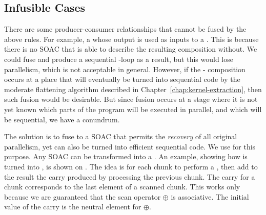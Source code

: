 \subsection{Infusible Cases}
\label{sec:streamseq-fusion}

There are some producer-consumer relationships that cannot be fused by
the above rules.  For example, a  whose output is used
as inputs to a .  This is because there is no SOAC that is
able to describe the resulting composition without.  We could fuse and
produce a sequential -loop as a result, but this would lose
parallelism, which is not acceptable in general.  However, if the
- composition occurs at a place that will eventually
be turned into sequential code by the moderate flattening algorithm
described in Chapter~\ref{chap:kernel-extraction}, then such fusion
would be desirable.  But since fusion occurs at a stage where it is
not yet known which parts of the program will be executed in parallel,
and which will be sequential, we have a conundrum.

The solution is to fuse to a SOAC that permits the \textit{recovery}
of all original parallelism, yet can also be turned into efficient
sequential code.  We use  for this purpose.  Any SOAC
can be transformed into a .  An example, showing how
 is turned into , is shown on
.  The idea is for each chunk to
perform a , then add to the result the carry produced by
processing the previous chunk.  The carry for a chunk corresponds to
the last element of a scanned chunk.  This works only because we are
guaranteed that the scan operator $\oplus$ is associative.  The
initial value of the carry is the neutral element for $\oplus$.

